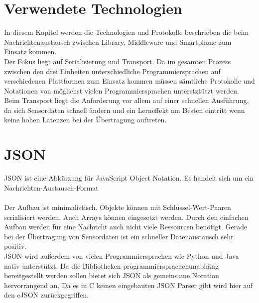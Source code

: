 \documentclass[11pt,a4paper]{report}
\begin{document}
\section{Verwendete Technologien}\label{sec:net_tech}
In diesem Kapitel werden die Technologien und Protokolle beschrieben die beim Nachrichtenaustausch zwischen Library, Middleware und Smartphone zum Einsatz kommen.
\\
Der Fokus liegt auf Serialisierung und Transport.
Da im gesamten Prozess zwischen den drei Einheiten unterschiedliche Programmiersprachen auf verschiedenen Plattformen zum Einsatz kommen müssen sämtliche Protokolle und Notationen von möglichst vielen Programmiersprachen unterstztützt werden.
\\
Beim Transport liegt die Anforderung vor allem auf einer schnellen Ausführung, da sich Sensordaten schnell ändern und ein Lerneffekt am Besten eintritt wenn keine hohen Latenzen bei der Übertragung auftreten.

\section{JSON}
JSON ist eine Abkürzung für JavaScript Object Notation.
Es handelt sich um ein Nachrichten-Austausch-Format \cite{json}
\\\\
Der Aufbau ist minimalistisch. Objekte können mit Schlüssel-Wert-Paaren serialisiert werden.
Auch Arrays können eingesetzt werden.
Durch den einfachen Aufbau werden für eine Nachricht auch nicht viele Ressourcen benötigt.
Gerade bei der Übertragung von Sensordaten ist ein schneller Datenaustausch sehr positiv.
\\
JSON wird außerdem von vielen Programmiersprachen wie Python und Java nativ unterstützt.
Da die Bibliotheken programmiersprachenunabhäng bereitgestellt werden sollen bietet sich JSON als gemeinsame Notation hervorrangend an.
Da es in C keinen eingebauten JSON Parser gibt wird hier auf den cJSON \cite{cjson} zurückgegriffen.
\end{document}
